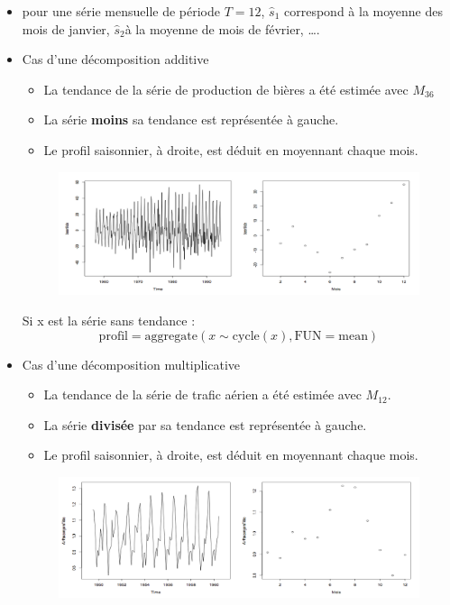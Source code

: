 \begin{itemize}
\item pour une série mensuelle de période $T = 12$, $\hat{s}_{1}$ correspond à la moyenne des mois de janvier, $\hat{s}_{2}$à la moyenne de mois de février, \dots.
\item Cas d'une décomposition additive
\begin{itemize}
\item La tendance de la série de production de bières a été estimée avec $M_{36}$
\item La série \textbf{moins} sa tendance est représentée à gauche.
\item Le profil saisonnier, à droite, est déduit en moyennant chaque mois.
\end{itemize}
\begin{figure}[H]\begin{center}\includegraphics[scale=0.8]{ilu/ccm38.png}\end{center}\end{figure}
Si x est la série sans tendance : 
$$\textrm{profil}=\textrm{aggregate}(x \sim \textrm{cycle}(x),\textrm{FUN}=\textrm{mean})$$
\item Cas d'une décomposition multiplicative
\begin{itemize}
\item La tendance de la série de trafic aérien a été estimée avec $M_{12}$.
\item La série \textbf{divisée} par sa tendance est représentée à gauche.
\item Le profil saisonnier, à droite, est déduit en moyennant chaque mois.
\end{itemize}
\begin{figure}[H]\begin{center}\includegraphics[scale=0.8]{ilu/ccm39.png}\end{center}\end{figure}
\end{itemize}
